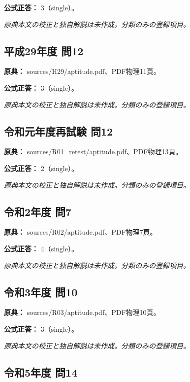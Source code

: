 \textbf{公式正答：} 3（single）。

\par\textit{原典本文の校正と独自解説は未作成。分類のみの登録項目。}

\subsection{平成29年度 問12}
\label{q:h29-reg-apt-12}

\noindent\textbf{原典：} sources/H29/aptitude.pdf、PDF物理11頁。

\textbf{公式正答：} 3（single）。

\par\textit{原典本文の校正と独自解説は未作成。分類のみの登録項目。}

\subsection{令和元年度再試験 問12}
\label{q:r01-ret-apt-12}

\noindent\textbf{原典：} sources/R01\_retest/aptitude.pdf、PDF物理13頁。

\textbf{公式正答：} 2（single）。

\par\textit{原典本文の校正と独自解説は未作成。分類のみの登録項目。}

\subsection{令和2年度 問7}
\label{q:r02-reg-apt-07}

\noindent\textbf{原典：} sources/R02/aptitude.pdf、PDF物理7頁。

\textbf{公式正答：} 4（single）。

\par\textit{原典本文の校正と独自解説は未作成。分類のみの登録項目。}

\subsection{令和3年度 問10}
\label{q:r03-reg-apt-10}

\noindent\textbf{原典：} sources/R03/aptitude.pdf、PDF物理10頁。

\textbf{公式正答：} 3（single）。

\par\textit{原典本文の校正と独自解説は未作成。分類のみの登録項目。}

\subsection{令和5年度 問14}
\label{q:r05-reg-apt-14}

